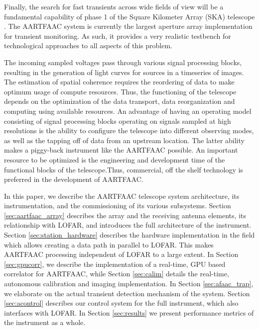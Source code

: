 \documentclass{ws-jai}
\begin{document}
Finally, the  search for fast  transients across wide fields  of view will  be a
fundamental capability of phase 1 of  the Square Kilometer Array (SKA) telescope
\cite{colegate2011searching}.  The  AARTFAAC  system  is  currently  the  largest
aperture array implementation  for transient monitoring. As such,  it provides a
very realistic  testbench for  technological approaches to  all aspects  of this
problem.

The incoming  sampled voltages  pass through  various signal  processing blocks,
resulting  in the  generation of  light curves  for sources  in a  timeseries of
images.  The estimation of spatial coherence  requires the reordering of data to
make optimum usage of compute resources.  Thus, the functioning of the telescope
depends  on the  optimization of  the  data transport,  data reorganization  and
computing using available resources.  An  advantage of having an operating model
consisting  of signal  processing blocks  operating on  signals sampled  at high
resolutions is the  ability to configure the telescope  into different observing
modes, as well as the tapping off of data from an upstream location.  The latter
ability makes a piggy-back instrument  like the AARTFAAC possible.  An important
resource  to  be optimized  is  the  engineering  and  development time  of  the
functional blocks of the telescope.Thus, commercial, off the shelf technology is
preferred in the development of AARTFAAC.

In  this paper,  we describe  the  AARTFAAC telescope  system architecture,  its
instrumentation,  and  the commissioning  of  its  various subsystems.   Section
\ref{sec:aartfaac_array} describes the array and the receiving antenna elements,
its  relationship  with LOFAR,  and  introduces  the  full architecture  of  the
instrument.    Section   \ref{sec:station_hardware}   describes   the   hardware
implementation in  the field which  allows creating a  data path in  parallel to
LOFAR. This  makes AARTFAAC processing independent  of LOFAR to a  large extent.
In Section \ref{sec:gpucorr}, we describe the implementation of a real-time, GPU
based  correlator  for  AARTFAAC,  while  Section  \ref{sec:calim}  details  the
real-time,  autonomous  calibration  and   imaging  implementation.  In  Section
\ref{sec:afaac_trap}, we  elaborate on the actual  transient detection mechanism
of the system.  Section \ref{sec:acontrol}  describes our control system for the
full instrument, which also interfaces with LOFAR.  In Section \ref{sec:results}
we present performance metrics of the instrument as a whole.
\end{document}
